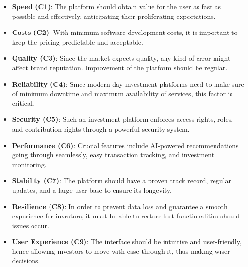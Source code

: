 \begin{itemize}
    \item \textbf{Speed (C1)}: The platform should obtain value for the user as fast as possible and effectively, anticipating their proliferating expectations.
    \item \textbf{Costs (C2)}: With minimum software development costs, it is important to keep the pricing predictable and acceptable.
    \item \textbf{Quality (C3)}: Since the market expects quality, any kind of error might affect brand reputation. Improvement of the platform should be regular.
    \item \textbf{Reliability (C4)}: Since modern-day investment platforms need to make sure of minimum downtime and maximum availability of services, this factor is critical.
    \item \textbf{Security (C5)}: Such an investment platform enforces access rights, roles, and contribution rights through a powerful security system.
    \item \textbf{Performance (C6)}: Crucial features include AI-powered recommendations going through seamlessly, easy transaction tracking, and investment monitoring.
    \item \textbf{Stability (C7)}: The platform should have a proven track record, regular updates, and a large user base to ensure its longevity.
    \item \textbf{Resilience (C8)}: In order to prevent data loss and guarantee a smooth experience for investors, it must be able to restore lost functionalities should issues occur.
    \item \textbf{User Experience (C9)}: The interface should be intuitive and user-friendly, hence allowing investors to move with ease through it, thus making wiser decisions.
\end{itemize}

